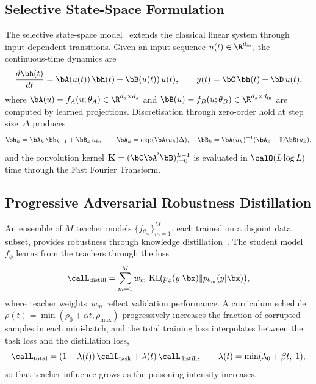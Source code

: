 \subsection{Selective State-Space Formulation}

The selective state-space model~\cite{Gu2022,Gu2024} extends the classical linear system through input-dependent transitions. Given an input sequence $u(t)\in\R^{d_{\mathrm{in}}}$, the continuous-time dynamics are
\begin{equation}
\frac{d\bh(t)}{dt} = \bA(u(t))\,\bh(t) + \bB(u(t))\,u(t),
\qquad
y(t) = \bC\,\bh(t) + \bD\,u(t),
\label{eq:mamba_cts}
\end{equation}
where $\bA(u)=f_A(u;\theta_A)\in\R^{d_s\times d_s}$ and $\bB(u)=f_B(u;\theta_B)\in\R^{d_s\times d_{\mathrm{in}}}$ are computed by learned projections. Discretisation through zero-order hold at step size~$\Delta$ produces
\begin{equation}
\bh_k = \bar{\bA}_k\,\bh_{k-1} + \bar{\bB}_k\,u_k,
\qquad
\bar{\bA}_k = \exp(\bA(u_k)\Delta),
\quad
\bar{\bB}_k = \bA(u_k)^{-1}(\bar{\bA}_k - \mathbf{I})\bB(u_k),
\label{eq:mamba_disc}
\end{equation}
and the convolution kernel $\bar{\mathbf{K}}=(\bC\bar{\bA}^i\bar{\bB})_{i=0}^{L-1}$ is evaluated in $\calO(L\log L)$ time through the Fast Fourier Transform.

\subsection{Progressive Adversarial Robustness Distillation}

An ensemble of $M$ teacher models $\{f_{\theta_m}\}_{m=1}^M$, each trained on a disjoint data subset, provides robustness through knowledge distillation~\cite{Hinton2015,Xie2019}. The student model~$f_\phi$ learns from the teachers through the loss
\begin{equation}
\calL_{\mathrm{distill}}
= \sum_{m=1}^{M}w_m\;\mathrm{KL}\!\bigl(p_\phi(y|\bx)\|p_{\theta_m}(y|\bx)\bigr),
\label{eq:mamba_distill}
\end{equation}
where teacher weights~$w_m$ reflect validation performance. A curriculum schedule $\rho(t)=\min(\rho_0+\alpha t,\rho_{\max})$ progressively increases the fraction of corrupted samples in each mini-batch, and the total training loss interpolates between the task loss and the distillation loss,
\begin{equation}
\calL_{\mathrm{total}}
= (1-\lambda(t))\,\calL_{\mathrm{task}}
+ \lambda(t)\,\calL_{\mathrm{distill}},
\qquad
\lambda(t) = \min(\lambda_0+\beta t,\;1),
\label{eq:mamba_curriculum}
\end{equation}
so that teacher influence grows as the poisoning intensity increases.

